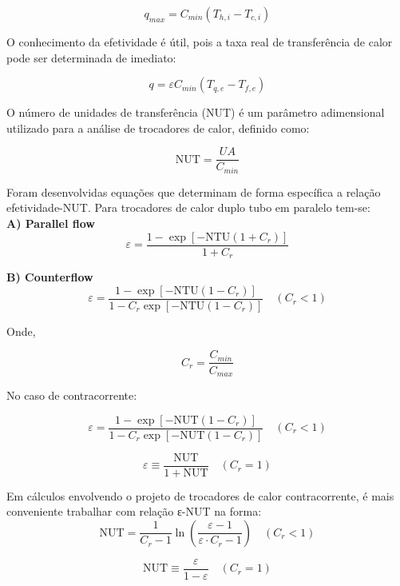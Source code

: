 \begin{equation}
	q_{max} = C_{min}  (T_{h,i} - T_{c,i})
\end{equation}

O conhecimento da efetividade é útil, pois a taxa real de transferência de calor pode ser determinada de imediato:

\begin{equation}
	q = \varepsilon C_{min} (T_{q,e} - T_{f,e})
\end{equation}

O número de unidades de transferência (NUT) é um parâmetro adimensional utilizado para a análise de trocadores de calor, definido como:

\begin{equation}
	\text{NUT} = \frac{UA}{C_{min}}
\end{equation}

Foram desenvolvidas equações que determinam de forma específica a relação efetividade-NUT. Para trocadores de calor duplo tubo em paralelo tem-se:\\

\textbf{A) Parallel flow}
\[
\varepsilon = \frac{1 - \exp \left[ -\text{NTU} (1 + C_r) \right]}{1 + C_r}
\]

\textbf{B) Counterflow}
\[
\varepsilon = \frac{1 - \exp \left[ -\text{NTU} (1 - C_r) \right]}{1 - C_r \exp \left[ -\text{NTU} (1 - C_r) \right]} \quad (C_r < 1)
\]

Onde, 

\begin{equation}
	C_r = \frac{C_{min}}{C_{max}}
\end{equation}

No caso de contracorrente:

\[
\varepsilon = \frac{1 - \exp \left[-\text{NUT} (1 - C_r)\right]}{1 - C_r \exp \left[-\text{NUT} (1 - C_r)\right]} \quad (C_r < 1)
\]

\[
\varepsilon \equiv \frac{\text{NUT}}{1 + \text{NUT}} \quad (C_r = 1)
\]


Em cálculos envolvendo o projeto de trocadores de calor contracorrente, é mais conveniente trabalhar com relação ε-NUT na forma:
\begin{equation}
	\text{NUT} = \frac{1}{C_r - 1} \ln \left( \frac{\varepsilon - 1}{\varepsilon \cdot C_r - 1} \right) \quad (C_r < 1)
\end{equation}

\begin{equation}
	\text{NUT} \equiv \frac{\varepsilon}{1 - \varepsilon} \quad (C_r = 1)
\end{equation}
